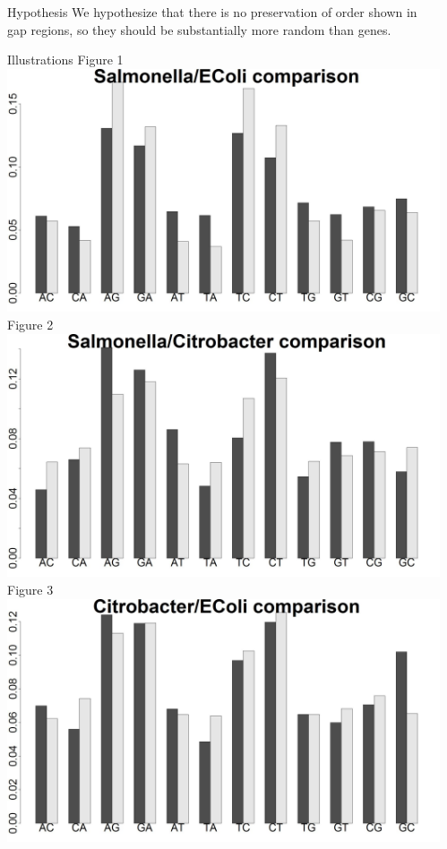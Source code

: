 \documentclass[final]{beamer}
\begin{document}
\begin{frame}{}
\begin{columns}[t]
\begin{column}{.32 \linewidth}
\end{column}


\begin{column}{.32 \linewidth}
 \begin{block}{\large Hypothesis}
	We hypothesize that there is no preservation of order shown in gap regions, so they should be substantially more random than genes.
	
\end{block}
\begin{block}{\large Illustrations}
Figure 1
	\includegraphics[scale = .455]{SalECPercentage.jpeg}
	\newline
Figure 2
 \includegraphics[scale = .455]{CBSalPercentage.jpeg}
 \newline
Figure 3
 \includegraphics[scale = .455]{CBECPercentage.jpeg}



\end{block}
\end{column}
\end{columns}
\end{frame}
\end{document}
